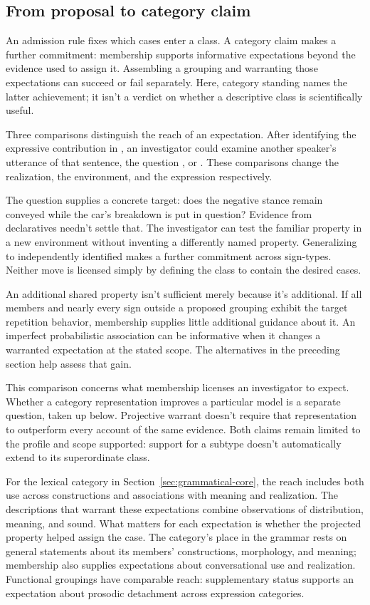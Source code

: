 \documentclass[12pt]{article}
\begin{document}
\subsection{From proposal to category claim}

An admission rule fixes which cases enter a class. A category claim
makes a further commitment: membership supports informative expectations
beyond the evidence used to assign it. Assembling a grouping and
warranting those expectations can succeed or fail separately. Here,
category standing names the latter achievement; it isn't a verdict
on whether a descriptive class is scientifically useful.

Three comparisons distinguish the reach of an expectation.
After identifying the expressive contribution in , an investigator could examine another speaker's utterance
of that sentence, the question ,
or . These comparisons change the
realization, the environment, and the expression respectively.

The question supplies a concrete target: does the negative stance
remain conveyed while the car's breakdown is put in question? Evidence
from declaratives needn't settle that. The investigator can test the
familiar property in a new environment without inventing a differently
named property. Generalizing to independently identified 
makes a further commitment across sign-types. Neither move is licensed
simply by defining the class to contain the desired cases.

An additional shared property isn't sufficient merely because it's
additional. If all members and nearly every sign outside a proposed
grouping exhibit the target repetition behavior, membership supplies
little additional guidance about it. An imperfect probabilistic association can be
informative when it changes a warranted expectation at the stated
scope. The alternatives in the preceding section help assess that gain.

This comparison concerns what membership licenses an investigator to
expect. Whether a category representation improves a particular model
is a separate question, taken up below. Projective warrant doesn't
require that representation to outperform every account of the same
evidence. Both claims remain limited to the profile and scope supported:
support for a subtype doesn't automatically extend to its superordinate
class.

For the lexical category in Section~\ref{sec:grammatical-core}, the reach
includes both use across constructions and associations with meaning
and realization. The descriptions that warrant these expectations combine
observations of distribution, meaning, and sound. What matters for each
expectation is whether the projected property helped assign the case. The
category's place in the grammar rests on general statements about its
members' constructions, morphology, and meaning; membership also supplies
expectations about conversational use and realization. Functional groupings
have comparable reach: supplementary status supports an expectation about
prosodic detachment across expression categories.
\end{document}
